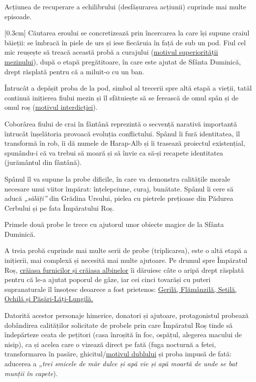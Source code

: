 \documentclass[
12pt,
a4paper
]{article}
\begin{document}
Acțiunea de recuperare a echilibrului (desfășurarea acțiunii) cuprinde mai multe episoade.

[0.3cm]
Căutarea eroului se concretizează prin încercarea la care își supune craiul băieții: se îmbracă în piele de urs și iese fiecăruia în față de sub un pod. Fiul cel mic reușește să treacă această probă a curajului (\underline{motivul superiorității mezinului}), după o etapă pregătitoare, în care este ajutat de Sfânta Duminică, drept răsplată pentru că a miluit-o cu un ban.

Întrucât a depășit proba de la pod, simbol al trecerii spre altă etapă a vieții, tatăl continuă inițierea fiului mezin și îl sfătuiește să se ferească de omul spân și de omul roș (\underline{motivul interdicției}).

Coborârea fiului de crai în fântână reprezintă o secvență narativă importantă întrucât înșelătoria provoacă evoluția conflictului. Spânul îi fură identitatea, îl transformă în rob, îi dă numele de Harap-Alb și îi trasează proiectul existențial, spunându-i că va trebui să moară și să învie ca să-și recapete identitatea (jurământul din fântână).

Spânul îl va supune la probe dificile, în care va demonstra calitățile morale necesare unui viitor împărat: înțelepciune, curaj, bunătate. Spânul îi cere să aducă \textit{„sălăți”} din Grădina Ursului, pielea cu pietrele prețioase din Pădurea Cerbului și pe fata Împăratului Roș.

Primele două probe le trece cu ajutorul unor obiecte magice de la Sfânta Duminică.

A treia probă cuprinde mai multe serii de probe (triplicarea), este o altă etapă a inițierii, mai complexă și necesită mai multe ajutoare. Pe drumul spre Împăratul Roș, \underline{crăiasa furnicilor și crăiasa albinelor} îi dăruiesc câte o aripă drept răsplată pentru că le-a ajutat poporul de gâze, iar cei cinci tovarăși cu puteri supranaturale îl însoțesc deoarece a fost prietenos: \underline{Gerilă, Flămânzilă, Setilă, Ochilă și Păsări-Lăți-Lungilă.}

Datorită acestor personaje himerice, donatori și ajutoare, protagonistul probează dobândirea calităților solicitate de probele prin care Împăratul Roș tinde să îndepărteze ceata de pețitori (casa înroșită în foc, ospățul, alegerea macului de nisip), ca și acelea care o vizează direct pe fată (fuga nocturnă a fetei, transformarea în pasăre, ghicitul/\underline{motivul dublului} și proba impusă de fată: aducerea a \textit{„trei smicele de măr dulce și apă vie și apă moartă de unde se bat munții în capete}).
\end{document}
